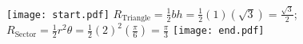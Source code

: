 \documentclass[12pt]{article}
\begin{document}
\begin{enumerate}
\begin{enumerate}
\texttt{[image: start.pdf]}
{{$R_{\text{Triangle}}=\frac{1}{2}bh=\frac{1}{2}(1)\left(\sqrt{3}\right)=\frac{\sqrt{3}}{2}$; $R_{\text{Sector}}=\frac{1}{2}r^2\theta=\frac{1}{2}(2)^2\left(\frac{\pi}{6}\right)=\frac{\pi}{3}$}}
\texttt{[image: end.pdf]}


\end{enumerate}

\end{enumerate}
\end{document}

